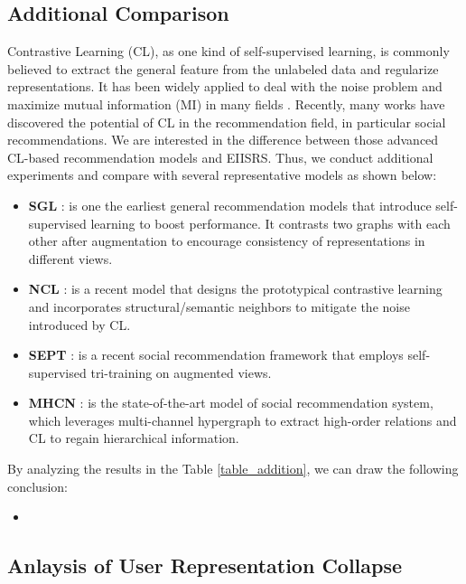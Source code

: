 \documentclass[letterpaper]{article} %
\begin{document}
\subsection{Additional Comparison}
Contrastive Learning (CL), as one kind of self-supervised learning, is commonly believed to extract the general feature from the unlabeled data and regularize representations. It has been widely applied to deal with the noise problem and maximize mutual information (MI) in many fields \cite{deepInfoMax,S4L,selfCL}. Recently, many works have discovered the potential of CL in the recommendation field, in particular social recommendations. We are interested in the difference between those advanced CL-based recommendation models and EIISRS. Thus, we conduct additional experiments and compare with several representative models as shown below:
\begin{itemize}
    \item \textbf{SGL} \cite{sgl}: is one the earliest general recommendation models that introduce self-supervised learning to boost performance. It contrasts two graphs with each other after augmentation to encourage consistency of representations in different views.
    \item \textbf{NCL} \cite{ncl}: is a recent model that designs the prototypical contrastive learning and incorporates structural/semantic neighbors to mitigate the noise introduced by CL.
    \item \textbf{SEPT} \cite{SEPT}: is a recent social recommendation framework that employs self-supervised tri-training on augmented views. 
    \item \textbf{MHCN} \cite{MHCN}: is the state-of-the-art model of social recommendation system, which leverages multi-channel hypergraph to extract high-order relations and CL to regain hierarchical information.
\end{itemize}
By analyzing the results in the Table \ref{table_addition}, we can draw the following conclusion:
\begin{itemize}
    \item 
\end{itemize}

\subsection{Anlaysis of User Representation Collapse}

\end{document}
